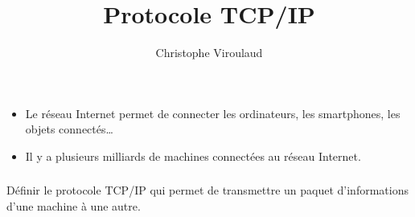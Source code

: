\documentclass[svgnames,11pt]{beamer}
\author[]{Christophe Viroulaud}
\title{Protocole TCP/IP}
\date{\framebox{\textbf{Int 02}}}
\institute{Seconde - SNT}
\begin{document}
\begin{frame}
\titlepage
\end{frame}
\begin{frame}
    \frametitle{}

    \begin{itemize}
        \item<1-> Le réseau Internet permet de connecter les ordinateurs, les smartphones, les objets connectés\dots
        \item<2-> Il y a plusieurs milliards de machines connectées au réseau Internet.
    \end{itemize}

\end{frame}
\begin{frame}
    \frametitle{}

    
    \begin{framed}
        \centering Définir le protocole TCP/IP qui permet de transmettre un paquet d'informations d'une machine à une autre.
    \end{framed}

\end{frame}
\end{document}
